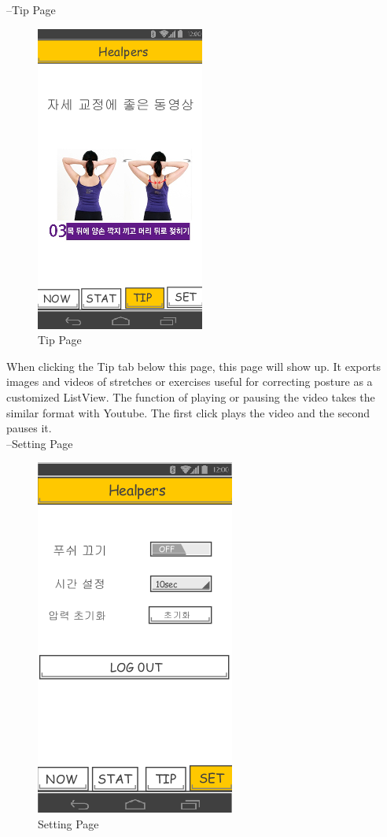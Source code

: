 \documentclass[conference]{IEEEtran}
\begin{document}
 --Tip Page

\begin{figure}[htbp]
\begin{center}
    \includegraphics[scale=1]{img_14}
    \caption{Tip Page} 
\end{center}
\end{figure}

When clicking the Tip tab below this page, this page will show up. It exports images and videos of stretches or exercises useful for correcting posture as a customized ListView. The function of playing or pausing the video takes the similar format with Youtube. The first click plays the video and the second pauses it.\\

 --Setting Page

\begin{figure}[htbp]
\begin{center}
    \includegraphics[scale=1]{img_15}
    \caption{Setting Page} 
\end{center}
\end{figure}
\end{document}
